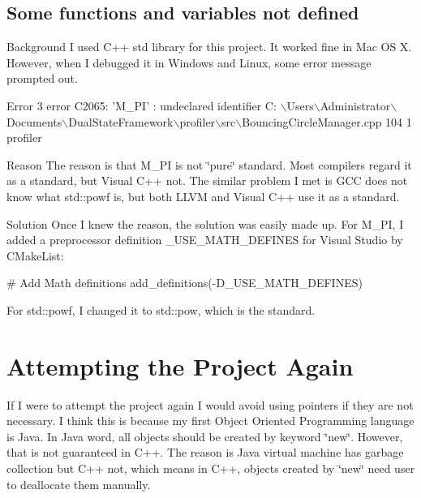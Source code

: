 \hypertarget{_reviewof_project_ReviewofProjectPEFSomefunctionsandvariablesnotdefined}{}\subsection{Some functions and variables not defined}\label{_reviewof_project_ReviewofProjectPEFSomefunctionsandvariablesnotdefined}
\begin{DoxyParagraph}{Background}
I used C++ std library for this project. It worked fine in Mac O\+S X. However, when I debugged it in Windows and Linux, some error message prompted out. 
\begin{DoxyCode}
Error   3   error C2065: \textcolor{stringliteral}{'M\_PI'} : undeclared identifier C:
      \(\backslash\)Users\(\backslash\)Administrator\(\backslash\)Documents\(\backslash\)DualStateFramework\(\backslash\)profiler\(\backslash\)src\(\backslash\)BouncingCircleManager.cpp  104 1   profiler
\end{DoxyCode}
 
\end{DoxyParagraph}
\begin{DoxyParagraph}{Reason}
The reason is that M\+\_\+\+P\+I is not \char`\"{}pure\char`\"{} standard. Most compilers regard it as a standard, but Visual C++ not. The similar problem I met is G\+C\+C does not know what std\+::powf is, but both L\+L\+V\+M and Visual C++ use it as a standard. 
\end{DoxyParagraph}
\begin{DoxyParagraph}{Solution}
Once I knew the reason, the solution was easily made up. For M\+\_\+\+P\+I, I added a preprocessor definition \+\_\+\+U\+S\+E\+\_\+\+M\+A\+T\+H\+\_\+\+D\+E\+F\+I\+N\+E\+S for Visual Studio by C\+Make\+List\+: 
\begin{DoxyCode}
\textcolor{preprocessor}{# Add Math definitions}
\textcolor{preprocessor}{add\_definitions(-D\_USE\_MATH\_DEFINES)}
\end{DoxyCode}
 For std\+::powf, I changed it to std\+::pow, which is the standard. 
\end{DoxyParagraph}
\hypertarget{_reviewof_project_ReviewofProjectAttemptingtheProjectAgain}{}\section{Attempting the Project Again}\label{_reviewof_project_ReviewofProjectAttemptingtheProjectAgain}
If I were to attempt the project again I would avoid using pointers if they are not necessary. I think this is because my first Object Oriented Programming language is Java. In Java word, all objects should be created by keyword \char`\"{}new\char`\"{}. However, that is not guaranteed in C++. The reason is Java virtual machine has garbage collection but C++ not, which means in C++, objects created by \char`\"{}new\char`\"{} need user to deallocate them manually. ~\newline

